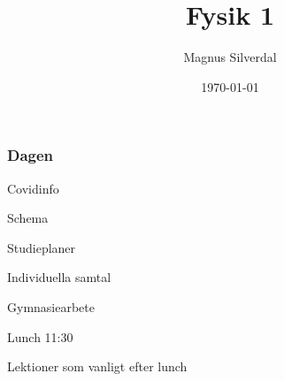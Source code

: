 \documentclass[11pt]{beamer}
\title{Fysik 1}
\author{Magnus Silverdal}
\institute{NTI Gymnasiet}
\date{\today}
\begin{document}
    \frame{\titlepage}

    \begin{frame}
        \frametitle{Dagen}
        \begin{enumeration}
            \item Covidinfo
            \item Schema
            \item Studieplaner
            \item Individuella samtal
            \item Gymnasiearbete
            \item Lunch 11:30
            \item Lektioner som vanligt efter lunch
        \end{enumeration}
    \end{frame}
\end{document}
